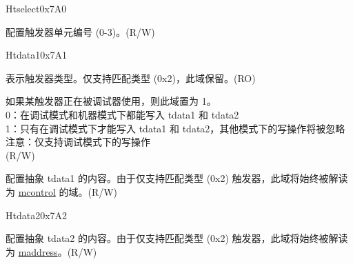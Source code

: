\begin{register}{H}{tselect}{0x7A0}\label{regdesc:TSELECT}
%
%
\regnewline%
\begin{regdesc}\begin{reglist}
\label{fielddesc:TSELECT}\item [tselect] 配置触发器单元编号 (0-3)。(R/W)
\end{reglist}\end{regdesc}
\end{register}

\begin{register}{H}{tdata1}{0x7A1}\label{regdesc:TDATA1}
%
%
%
\regnewline%
\begin{regdesc}\begin{reglist}
\label{fielddesc:TDATA1TYPE}\item [type] 表示触发器类型。仅支持匹配类型 (0x2)，此域保留。(RO)
\label{fielddesc:TDATA1DMODE}\item [dmode] 如果某触发器正在被调试器使用，则此域置为 1。\\
0：在调试模式和机器模式下都能写入 tdata1 和 tdata2\\
1：只有在调试模式下才能写入 tdata1 和 tdata2，其他模式下的写操作将被忽略\\
注意：仅支持调试模式下的写操作\\
(R/W)
\label{fielddesc:TDATA1DATA}\item [data] 配置抽象 tdata1 的内容。由于仅支持匹配类型 (0x2) 触发器，此域将始终被解读为 \hyperref[regdesc:MCONTROL]{mcontrol} 的域。(R/W)
\end{reglist}\end{regdesc}
\end{register}

\begin{register}{H}{tdata2}{0x7A2}\label{regdesc:TDATA2}
%
\regnewline%
\begin{regdesc}\begin{reglist}
\label{fielddesc:TDATA2}\item [tdata2] 配置抽象 tdata2 的内容。由于仅支持匹配类型 (0x2) 触发器，此域将始终被解读为 \hyperref[regdesc:MADDRESS]{maddress}。(R/W)
\end{reglist}\end{regdesc}
\end{register}

